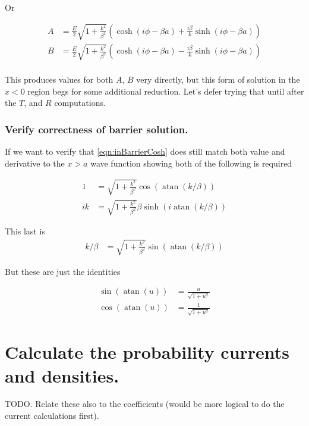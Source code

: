 \documentclass{article}
\DeclareMathOperator{\atan}{atan}
\begin{document}
Or

\begin{align*}
A &= \frac{E}{2} \sqrt{1 + \frac{k^2}{\beta^2}} \left(
\cosh\left( i\phi -\beta a \right) + \frac{i\beta}{k} \sinh\left( i\phi -\beta a \right) 
\right) \\
B &= \frac{E}{2} \sqrt{1 + \frac{k^2}{\beta^2}} \left(
\cosh\left( i\phi -\beta a \right) - \frac{i\beta}{k} \sinh\left( i\phi -\beta a \right) 
\right) \\
\end{align*}

This produces values for both $A$, $B$ very directly, but this 
form of solution in the $x<0$ region begs for some additional reduction.  Let's
defer trying that until after the $T$, and $R$ computations.

\subsubsection{ Verify correctness of barrier solution. }

If we want to verify that \ref{eqn:inBarrierCosh} 
does still match both value and derivative to the $x>a$ wave function
showing both of the following is required

\begin{align*}
1 &= \sqrt{1 + \frac{k^2}{\beta^2}} \cos\left( \atan(k/\beta) \right) \\
ik &=
\sqrt{1 + \frac{k^2}{\beta^2}} \beta \sinh\left( i \atan(k/\beta) \right)
\end{align*}

This last is
\begin{align*}
k/\beta &=
\sqrt{1 + \frac{k^2}{\beta^2}} \sin\left( \atan(k/\beta) \right)
\end{align*}

But these are just the identities

\begin{align*}
\sin\left( \atan(u) \right) &= \frac{u}{\sqrt{1 + u^2}} \\
\cos\left( \atan(u) \right) &= \frac{1}{\sqrt{1 + u^2}}
\end{align*}

\section{ Calculate the probability currents and densities. }

TODO.  Relate these also to the coefficients (would be more logical to do the current calculations first).
\end{document}
